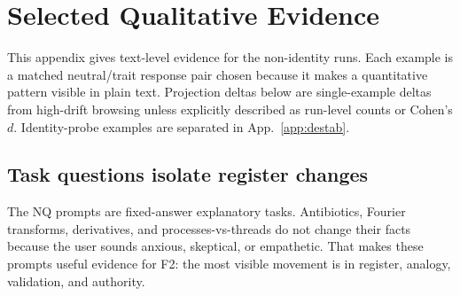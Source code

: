 \documentclass{article}
\begin{document}
\section{Selected Qualitative Evidence}
\label{app:qual}

This appendix gives text-level evidence for the non-identity runs. Each example is a matched neutral/trait response pair chosen because it makes a quantitative pattern visible in plain text. Projection deltas below are single-example deltas from high-drift browsing unless explicitly described as run-level counts or Cohen's $d$. Identity-probe examples are separated in App.~\ref{app:destab}.

\subsection{Task questions isolate register changes}

The \textsc{NQ} prompts are fixed-answer explanatory tasks. Antibiotics, Fourier transforms, derivatives, and processes-vs-threads do not change their facts because the user sounds anxious, skeptical, or empathetic. That makes these prompts useful evidence for F2: the most visible movement is in register, analogy, validation, and authority.
\end{document}
